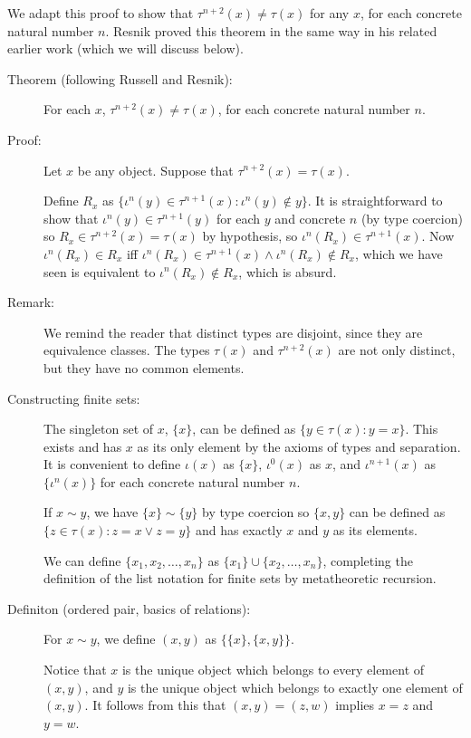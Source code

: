 \documentclass[12pt]{article}
\begin{document}
We adapt this proof to show that $\tau^{n+2}(x) \neq \tau(x)$ for any $x$, for each concrete natural number $n$.  Resnik proved this theorem in the same way in his related earlier work (which we will discuss below).
\begin{description}
\item[Theorem (following Russell and Resnik):]  For each $x$, $\tau^{n+2}(x) \neq \tau(x)$, for each concrete natural number $n$.

\item[Proof:]  Let $x$ be any object.  Suppose that $\tau^{n+2}(x)=\tau(x)$. 

Define $R_x$ as $\{\iota^n(y)\in \tau^{n+1}(x):\iota^n(y) \not\in y\}$.  It is straightforward to show that $\iota^n(y) \in \tau^{n+1}(y)$ for each $y$ and concrete $n$ (by type coercion) so $R_x \in \tau^{n+2}(x) = \tau(x)$ by hypothesis, so $\iota^n(R_x) \in \tau^{n+1}(x)$.    Now $\iota^n(R_x) \in R_x$ iff $\iota^n(R_x) \in \tau^{n+1}(x) \wedge \iota^n(R_x) \not\in R_x$, which we have seen is equivalent to $\iota^n(R_x) \not\in R_x$, which is absurd.

\item[Remark:]  We remind the reader that distinct types are disjoint, since they are equivalence classes.  The types $\tau(x)$ and $\tau^{n+2}(x)$ are not only distinct, but they have no common  elements.

\item[Constructing finite sets:]  The singleton set of $x$, $\{x\}$, can be defined as $\{y \in \tau(x):y=x\}$.  This exists and has $x$ as its only element by the axioms of types and separation.  It is convenient to define $\iota(x)$ as $\{x\}$, $\iota^0(x)$ as $x$,
and $\iota^{n+1}(x)$ as $\{\iota^n(x)\}$ for each concrete natural number $n$.

If $x \sim y$, we have $\{x\} \sim \{y\}$ by type coercion so $\{x,y\}$ can be defined
as $\{z \in \tau(x):z =x \vee z=y\}$ and has exactly $x$ and $y$ as its elements.

We can define $\{x_1,x_2,\ldots,x_n\}$ as $\{x_1\} \cup \{x_2,\ldots,x_n\}$, completing the definition of the list notation for finite sets by metatheoretic recursion.

\item[Definiton (ordered pair, basics of relations):]  For $x \sim y$, we define $(x,y)$ as $\{\{x\},\{x,y\}\}$.  

Notice that $x$ is the unique object which belongs to every element of $(x,y)$, and $y$ is the unique object which belongs to exactly one element of $(x,y)$.  It follows from this that $(x,y)=(z,w)$ implies $x=z$ and $y=w$.  


\end{description}
\end{document}
